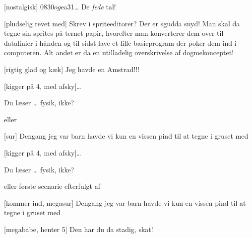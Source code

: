 \documentclass[danish]{article}
\begin{document}
\begin{sketch}
[nostalgisk] $0830 og $ea31\ldots{} De \emph{fede} tal!

[pludselig revet med] Skrev i spriteeditorer? Der er sgudda snyd! Man
skal da tegne sin sprites på ternet papir, hvorefter man konverterer dem over
til datalinier i hånden og til sidst lave et lille basicprogram der poker dem
ind i computeren. Alt andet er da en utilladelig overskrivelse af
dogmekonceptet!

[rigtig glad og kæk] Jeg havde en Amstrad!!!

[kigger på 4, med afsky]\ldots

 Du læser \ldots{} fysik, ikke?

\scene eller

[sur] Dengang jeg var barn havde vi kun en vissen pind til at tegne i gruset med

[kigger på 4, med afsky]\ldots

 Du læser \ldots{} fysik, ikke?

\scene eller første scenarie efterfulgt af

[kommer ind, megasur] Dengang jeg var barn havde vi kun en vissen pind til at tegne i gruset med

[megababe, henter 5] Den har du da stadig, skat!

\end{sketch}
\end{document}

